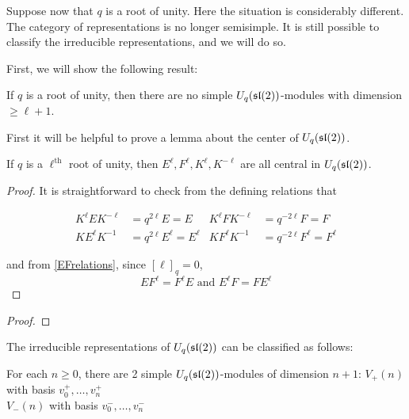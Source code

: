 Suppose now that $q$ is a root of unity. Here the situation is considerably
different. The category of representations is no longer semisimple. It is
still possible to classify the irreducible representations, and we will do so. 

First, we will show the following result:

\begin{theorem}
If $q$ is a root of unity, then there are no simple $U_q(\mathfrak{sl}(2))$-modules
with dimension $\geq \ell+1$. 
\end{theorem}

First it will be helpful to prove a lemma about the center of $U_q(\mathfrak{sl}(2))$.

\begin{lemma}
    If $q$ is a $\ell^\text{th}$ root of unity, then $E^\ell, F^\ell, K^\ell,
    K^{-\ell}$ are all central in $U_q(\mathfrak{sl}(2))$.
\end{lemma}
\begin{proof}
    It is straightforward to check from the defining relations that 

    \begin{align}
        K^\ell E K^{-\ell} &= q^{2\ell}E = E  & K^{\ell}FK^{-\ell} &= q^{-2\ell}F = F\\
        K E^\ell K^{-1} &= q^{2\ell}E^\ell = E^\ell  & KF^\ell K^{-1} &= q^{-2\ell}F^\ell = F^\ell
    \end{align}
    
    and from \ref{EFrelations}, since $[\ell]_q = 0$, 
    \begin{equation}
        EF^\ell = F^\ell E \text{ and } E^\ell F = FE^\ell
    \end{equation}

\end{proof}
\begin{proof}
\end{proof}

The irreducible representations of
$U_q(\mathfrak{sl}(2))$ can be classified as follows: 

For each $n\geq 0$, there are 2 simple $U_q(\mathfrak{sl}(2))$-modules of dimension $n+1$: 
$V_+(n)$ with basis $v^+_0, \ldots, v^+_n$ \\
$V_-(n)$ with basis $v^-_0, \ldots, v^-_n$

